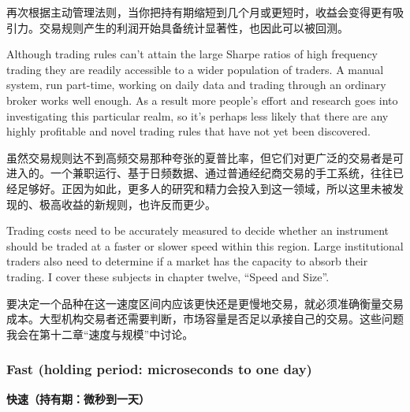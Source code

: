 \begin{chineseblock}再次根据主动管理法则，当你把持有期缩短到几个月或更短时，收益会变得更有吸引力。交易规则产生的利润开始具备统计显著性，也因此可以被回测。\end{chineseblock}

\bipairgap

\begin{englishblock} Although trading rules can't attain the large Sharpe ratios of high frequency trading they are readily accessible to a wider population of traders. A manual system, run part-time, working on daily data and trading through an ordinary broker works well enough. As a result more people's effort and research goes into investigating this particular realm, so it's perhaps less likely that there are any highly profitable and novel trading rules that have not yet been discovered. \end{englishblock}

\begin{chineseblock}虽然交易规则达不到高频交易那种夸张的夏普比率，但它们对更广泛的交易者是可进入的。一个兼职运行、基于日频数据、通过普通经纪商交易的手工系统，往往已经足够好。正因为如此，更多人的研究和精力会投入到这一领域，所以这里未被发现的、极高收益的新规则，也许反而更少。\end{chineseblock}

\bipairgap

\begin{englishblock} Trading costs need to be accurately measured to decide whether an instrument should be traded at a faster or slower speed within this region. Large institutional traders also need to determine if a market has the capacity to absorb their trading. I cover these subjects in chapter twelve, ``Speed and Size''. \end{englishblock}

\begin{chineseblock}要决定一个品种在这一速度区间内应该更快还是更慢地交易，就必须准确衡量交易成本。大型机构交易者还需要判断，市场容量是否足以承接自己的交易。这些问题我会在第十二章“速度与规模”中讨论。\end{chineseblock}

\subsubsection*{Fast (holding period: microseconds to one day)} \medskip \noindent\textbf{快速（持有期：微秒到一天）} \par \smallskip


